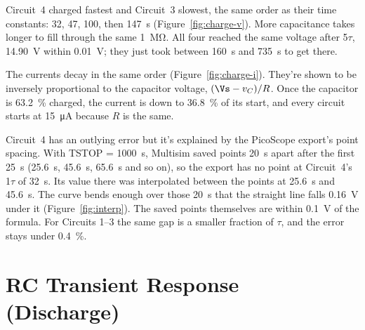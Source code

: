 \documentclass[offwhitecover]{lennylab}
\newcommand{\ntau}[1]{#1\(\tau\)}   %
\newcommand{\partlabel}[1]{\headlabel{Part~#1}}
\begin{document}
\begin{marginfigure}[2pt]
  
  \caption{Circuit~4 near its \ntau{1}. The export's nearest points are \qty{20}{\second} apart, and the straight line between them passes \qty{0.16}{\volt} under the curve at \qty{31.97}{\second}.}
  \label{fig:interp}
\end{marginfigure}%
Circuit~4 charged fastest and Circuit~3 slowest, the same order as their time constants: 32, 47, 100, then \qty{147}{\second} (Figure~\ref{fig:charge-v}). More capacitance takes longer to fill through the same \qty{1}{\mega\ohm}. All four reached the same voltage after \ntau{5}, \qty{14.90}{\volt} within \qty{0.01}{\volt}; they just took between \qty{160}{\second} and \qty{735}{\second} to get there.

The currents decay in the same order (Figure~\ref{fig:charge-i}). They're shown to be inversely proportional to the capacitor voltage, $(\Vs - v_C) / R$. Once the capacitor is \qty{63.2}{\percent} charged, the current is down to \qty{36.8}{\percent} of its start, and every circuit starts at \qty{15}{\micro\ampere} because $R$ is the same.

Circuit~4 has an outlying error but it's explained by the PicoScope export's point spacing. With TSTOP = \qty{1000}{\second}, Multisim saved points \qty{20}{\second} apart after the first \qty{25}{\second} (\qty{25.6}{\second}, \qty{45.6}{\second}, \qty{65.6}{\second} and so on), so the export has no point at Circuit~4's \ntau{1} of \qty{32}{\second}. Its value there was interpolated between the points at \qty{25.6}{\second} and \qty{45.6}{\second}. The curve bends enough over those \qty{20}{\second} that the straight line falls \qty{0.16}{\volt} under it (Figure~\ref{fig:interp}). The saved points themselves are within \qty{0.1}{\volt} of the formula. For Circuits 1--3 the same gap is a smaller fraction of $\tau$, and the error stays under \qty{0.4}{\percent}.

\section{\partlabel{3}RC Transient Response (Discharge)}

\begin{marginfigure}[-0.75in]
  
  \caption{Part~3 circuits, redrawn from the Multisim build. The sources are gone, each \qty{1}{\mega\ohm} sits across its capacitor, and the initial conditions (IC) stand in for the charge. Circuit~4's \qty{4.8}{\volt} and \qty{10.2}{\volt} add to \qty{15}{\volt}. The AV probes are where they were in Part~2, so the discharge current flows against their arrows.}
  \label{fig:discharge-circuits}
\end{marginfigure}
\end{document}
